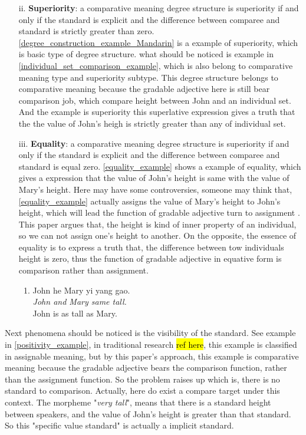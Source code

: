 \documentclass{ctexart}
\let \cite \parencite
\begin{document}
\begin{itemize}
\begin{itemize}
        \item[ii.] \textbf{Superiority}: a comparative meaning degree structure is superiority if and only if the standard is explicit and the difference between comparee and standard is strictly greater than zero. \ref{degree_construction_example_Mandarin} is a example of superiority, which is basic type of degree structure. what should be noticed is example in \ref{individual_set_comparison_example}, which is also belong to comparative meaning type and superiority subtype. This degree structure belongs to comparative meaning because the gradable adjective here is still bear comparison job, which compare height between John and an individual set. And the example is superiority this superlative expression gives a truth that the the value of John's heigh is strictly greater than any of individual set.
        
        \item[iii.] \textbf{Equality}: a comparative meaning degree structure is superiority if and only if the standard is explicit and the difference between comparee and standard is equal zero. \ref{equality_example} shows a example of equality, which gives a expression that the value of John's height is same with the value of Mary's height. Here may have some controversies, someone may think that, \ref{equality_example} actually assigns the value of Mary's height to John's height, which will lead the function of gradable adjective turn to assignment \cite{guo2012}. This paper argues that, the height is kind of inner property of an individual, so we can not assign one's height to another. On the opposite, the essence of equality is to express a truth that, the difference between tow individuals height is zero, thus the function of gradable adjective in equative form is comparison rather than assignment.
        
        \begin{enumerate}
            \item \label{equality_example}
            John he Mary yi yang gao.\\
            \textit{John and Mary same tall.}\\
            John is as tall as Mary.
        \end{enumerate}

    \end{itemize}   

\end{itemize}

\noindent
Next phenomena should be noticed is the visibility of the standard. See example in \ref{positivity_example}, in traditional research \hl{ref here}, this example is classified in assignable meaning, but by this paper's approach, this example is comparative meaning because the gradable adjective bears the comparison function, rather than the assignment function. So the problem raises up which is, there is no standard to comparison. Actually, here do exist a compare target under this context. The morpheme "\textit{very tall}", means that there is a standard height between speakers, and the value of John's height is greater than that standard. So this "specific value standard" is actually a implicit standard.
\end{document}
